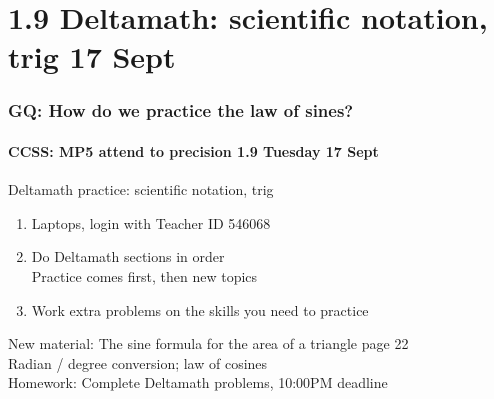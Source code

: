 \documentclass{beamer}
\begin{document}
  \section{1.9 Deltamath: scientific notation, trig 17 Sept}
  \frame
  {
    \frametitle{GQ: How do we practice the law of sines?}
    \framesubtitle{CCSS: MP5 attend to precision \hfill \alert{1.9 Tuesday 17 Sept}}

    \begin{block}{Deltamath practice: scientific notation, trig}
      \begin{enumerate}
        \item Laptops, login with Teacher ID \alert{546068}
        \item Do Deltamath sections in order \\
        Practice comes first, then new topics
        \item Work extra problems on the skills you need to practice
    \end{enumerate}
    \end{block}
    New material: The sine formula for the area of a triangle page 22\\
    Radian / degree conversion; law of cosines\\ \smallskip
    Homework: Complete Deltamath problems, 10:00PM deadline
  }
\end{document}
